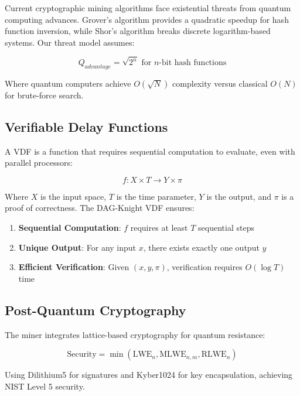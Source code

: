 \documentclass[11pt,a4paper]{article}
\begin{document}
Current cryptographic mining algorithms face existential threats from quantum computing advances. Grover's algorithm provides a quadratic speedup for hash function inversion, while Shor's algorithm breaks discrete logarithm-based systems. Our threat model assumes:

\begin{equation}
    Q_{advantage} = \sqrt{2^n} \text{ for } n\text{-bit hash functions}
\end{equation}

Where quantum computers achieve $O(\sqrt{N})$ complexity versus classical $O(N)$ for brute-force search.

\subsection{Verifiable Delay Functions}

A VDF is a function that requires sequential computation to evaluate, even with parallel processors:

\begin{equation}
    f: X \times T \rightarrow Y \times \pi
\end{equation}

Where $X$ is the input space, $T$ is the time parameter, $Y$ is the output, and $\pi$ is a proof of correctness. The DAG-Knight VDF ensures:

\begin{enumerate}
    \item \textbf{Sequential Computation}: $f$ requires at least $T$ sequential steps
    \item \textbf{Unique Output}: For any input $x$, there exists exactly one output $y$
    \item \textbf{Efficient Verification}: Given $(x, y, \pi)$, verification requires $O(\log T)$ time
\end{enumerate}

\subsection{Post-Quantum Cryptography}

The miner integrates lattice-based cryptography for quantum resistance:

\begin{equation}
    \text{Security} = \min(\text{LWE}_n, \text{MLWE}_{n,m}, \text{RLWE}_n)
\end{equation}

Using Dilithium5 for signatures and Kyber1024 for key encapsulation, achieving NIST Level 5 security.
\end{document}
